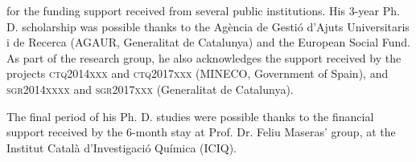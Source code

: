 
 for the funding support received from several public institutions. His 3-year Ph. D. scholarship was possible thanks to the Agència de Gestió d'Ajuts Universitaris i de Recerca (AGAUR, Generalitat de Catalunya) and the European Social Fund. As part of the research group, he also acknowledges the support received by the projects \textsc{ctq2014xxx} and \textsc{ctq2017xxx} (MINECO, Government of Spain), and \textsc{sgr2014xxxx} and \textsc{sgr2017xxx} (Generalitat de Catalunya).

The final period of his Ph. D. studies were possible thanks to the financial support received by the 6-month stay at Prof. Dr. Feliu Maseras' group, at the Institut Català d'Investigació Química (ICIQ).
